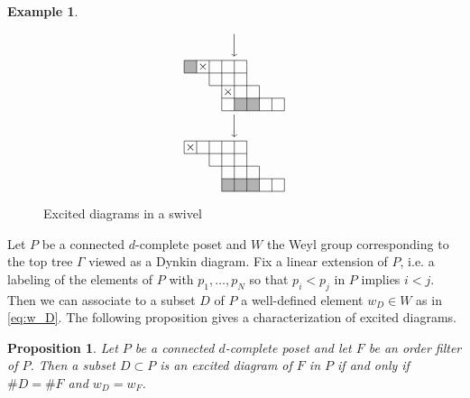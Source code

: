 \documentclass[10pt]{amsart}
\newtheorem{prop}[theo]{Proposition}
\theoremstyle{definition}
\newtheorem{exam}[theo]{Example}
\theoremstyle{remark}
\begin{document}
\begin{exam}
\begin{figure}[!htb]
$$\begin{CD}
@. @VVV
\\
@.
\raisebox{-20pt}{
\begin{picture}(80,40)
\fboxsep=0mm
\put(0,30){\colorbox[gray]{0.7}{\makebox(10,10){}}}
\put(40,0){\colorbox[gray]{0.7}{\makebox(10,10){}}}
\put(50,0){\colorbox[gray]{0.7}{\makebox(10,10){}}}
\put(0,40){\line(1,0){50}}
\put(0,30){\line(1,0){50}}
\put(20,20){\line(1,0){40}}
\put(30,10){\line(1,0){50}}
\put(30,0){\line(1,0){50}}
\put(0,30){\line(0,1){10}}
\put(10,30){\line(0,1){10}}
\put(20,20){\line(0,1){20}}
\put(30,0){\line(0,1){40}}
\put(40,0){\line(0,1){40}}
\put(50,0){\line(0,1){40}}
\put(60,0){\line(0,1){20}}
\put(70,0){\line(0,1){10}}
\put(80,0){\line(0,1){10}}
\put(10,30){\makebox(10,10){$\times$}}
\put(30,10){\makebox(10,10){$\times$}}
\end{picture}
}
\\
@. @VVV
\\
@.
\raisebox{-20pt}{
\begin{picture}(80,40)
\fboxsep=0mm
\put(30,0){\colorbox[gray]{0.7}{\makebox(10,10){}}}
\put(40,0){\colorbox[gray]{0.7}{\makebox(10,10){}}}
\put(50,0){\colorbox[gray]{0.7}{\makebox(10,10){}}}
\put(0,40){\line(1,0){50}}
\put(0,30){\line(1,0){50}}
\put(20,20){\line(1,0){40}}
\put(30,10){\line(1,0){50}}
\put(30,0){\line(1,0){50}}
\put(0,30){\line(0,1){10}}
\put(10,30){\line(0,1){10}}
\put(20,20){\line(0,1){20}}
\put(30,0){\line(0,1){40}}
\put(40,0){\line(0,1){40}}
\put(50,0){\line(0,1){40}}
\put(60,0){\line(0,1){20}}
\put(70,0){\line(0,1){10}}
\put(80,0){\line(0,1){10}}
\put(0,30){\makebox(10,10){$\times$}}
\end{picture}
}
\end{CD}
$$
\caption{Excited diagrams in a swivel}
\label{fig:swivel_excited}
\end{figure}
\end{exam}

Let $P$ be a connected $d$-complete poset 
and $W$ the Weyl group corresponding to the top tree $\Gamma$ viewed as a Dynkin diagram. 
Fix a linear extension of $P$, 
i.e. a labeling of the elements of $P$ with $p_1, \dots, p_N$ so that $p_i < p_j$ in $P$ 
implies $i < j$.
Then we can associate to a subset $D$ of $P$ a well-defined element $w_D \in W$ as in 
\eqref{eq:w_D}.
The following proposition gives a characterization of excited diagrams.

\begin{prop}
\label{prop:E=R}
Let $P$ be a connected $d$-complete poset and let $F$ be an order filter of $P$.
Then a subset $D \subset P$ is an excited diagram of $F$ in $P$ 
if and only if $\# D = \# F$ and $w_D = w_F$.
\end{prop}
\end{document}
